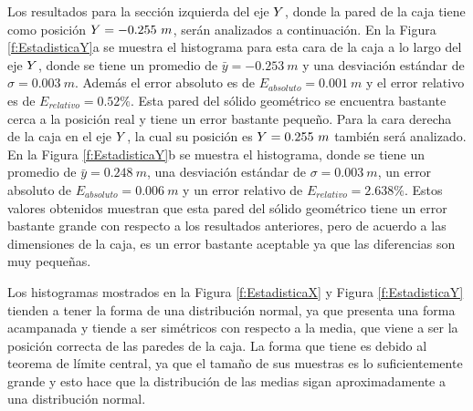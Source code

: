 
Los resultados para la sección izquierda del eje $\mathnormal Y$, donde la pared de 
la caja tiene como posición $\mathnormal Y = -0.255~m$, serán analizados 
a continuación. En la Figura \ref{f:EstadisticaY}a se muestra el histograma para esta 
cara de la caja a lo largo del eje $\mathnormal Y$, donde se tiene un promedio de 
$\bar{y} = -0.253~m$ y una desviación estándar de $\sigma = 0.003~m$. Además el error 
absoluto es de $E_{absoluto} = 0.001~m$ y el error relativo es de 
$E_{relativo} = 0.52\%$. Esta pared del sólido geométrico se encuentra bastante cerca 
a la posición real y tiene un error bastante pequeño. Para la cara derecha de la caja 
en el eje $\mathnormal Y$, la cual su posición es $\mathnormal Y = 0.255~m$ también será analizado. 
En la Figura \ref{f:EstadisticaY}b se muestra el histograma, donde se tiene un promedio 
de $\bar{y} = 0.248~m$, una desviación estándar de $\sigma = 0.003~m$, un error absoluto 
de $E_{absoluto} = 0.006~m$ y un error relativo de $E_{relativo} = 2.638\%$. Estos 
valores obtenidos muestran que esta pared del sólido geométrico tiene un error 
bastante grande con respecto a los resultados anteriores, pero de acuerdo a las 
dimensiones de la caja, es un error bastante aceptable ya que las diferencias son muy 
pequeñas.

Los histogramas mostrados en la Figura \ref{f:EstadisticaX} y Figura \ref{f:EstadisticaY}
tienden a tener la forma de una distribución normal, ya que presenta una forma acampanada
y tiende a ser simétricos con respecto a la media, que viene a ser la posición correcta 
de las paredes de la caja. La forma que tiene es debido al teorema de límite central, ya 
que el tamaño de sus muestras es lo suficientemente grande y esto hace que la distribución 
de las medias sigan aproximadamente a una distribución normal.

